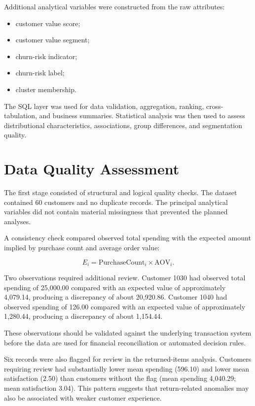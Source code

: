 \documentclass[11pt,a4paper]{article}
\begin{document}
Additional analytical variables were constructed from the raw attributes:

\begin{itemize}
    \item customer value score;
    \item customer value segment;
    \item churn-risk indicator;
    \item churn-risk label;
    \item cluster membership.
\end{itemize}

The SQL layer was used for data validation, aggregation, ranking,
cross-tabulation, and business summaries. Statistical analysis was then
used to assess distributional characteristics, associations, group
differences, and segmentation quality.

\section{Data Quality Assessment}

The first stage consisted of structural and logical quality checks.
The dataset contained 60 customers and no duplicate records. The principal
analytical variables did not contain material missingness that prevented
the planned analyses.

A consistency check compared observed total spending with the expected
amount implied by purchase count and average order value:

\begin{equation}
E_i = \text{PurchaseCount}_i \times \text{AOV}_i.
\end{equation}

Two observations required additional review. Customer 1030 had observed
total spending of 25,000.00 compared with an expected value of approximately
4,079.14, producing a discrepancy of about 20,920.86. Customer 1040 had
observed spending of 126.00 compared with an expected value of approximately
1,280.44, producing a discrepancy of about 1,154.44.

These observations should be validated against the underlying transaction
system before the data are used for financial reconciliation or automated
decision rules.

Six records were also flagged for review in the returned-items analysis.
Customers requiring review had substantially lower mean spending
(596.10) and lower mean satisfaction (2.50) than customers without the
flag (mean spending 4,040.29; mean satisfaction 3.04). This pattern
suggests that return-related anomalies may also be associated with weaker
customer experience.
\end{document}
